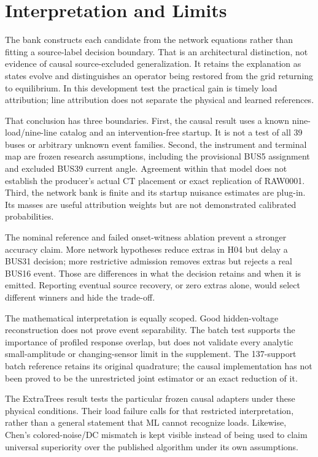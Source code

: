 \section{Interpretation and Limits}
\label{sec:discussion}

The bank constructs each candidate from the network equations rather than fitting a source-label decision boundary. That is an architectural distinction, not evidence of causal source-excluded generalization. It retains the explanation as states evolve and distinguishes an operator being restored from the grid returning to equilibrium. In this development test the practical gain is timely load attribution; line attribution does not separate the physical and learned references.

That conclusion has three boundaries. First, the causal result uses a known nine-load/nine-line catalog and an intervention-free startup. It is not a test of all 39 buses or arbitrary unknown event families. Second, the instrument and terminal map are frozen research assumptions, including the provisional BUS5 assignment and excluded BUS39 current angle. Agreement within that model does not establish the producer's actual CT placement or exact replication of RAW0001. Third, the network bank is finite and its startup nuisance estimates are plug-in. Its masses are useful attribution weights but are not demonstrated calibrated probabilities.

The nominal reference and failed onset-witness ablation prevent a stronger accuracy claim. More network hypotheses reduce extras in H04 but delay a BUS31 decision; more restrictive admission removes extras but rejects a real BUS16 event. Those are differences in what the decision retains and when it is emitted. Reporting eventual source recovery, or zero extras alone, would select different winners and hide the trade-off.

The mathematical interpretation is equally scoped. Good hidden-voltage reconstruction does not prove event separability. The batch test supports the importance of profiled response overlap, but does not validate every analytic small-amplitude or changing-sensor limit in the supplement. The 137-support batch reference retains its original quadrature; the causal implementation has not been proved to be the unrestricted joint estimator or an exact reduction of it.

The ExtraTrees result tests the particular frozen causal adapters under these physical conditions. Their load failure calls for that restricted interpretation, rather than a general statement that ML cannot recognize loads. Likewise, Chen's colored-noise/DC mismatch is kept visible instead of being used to claim universal superiority over the published algorithm under its own assumptions.

